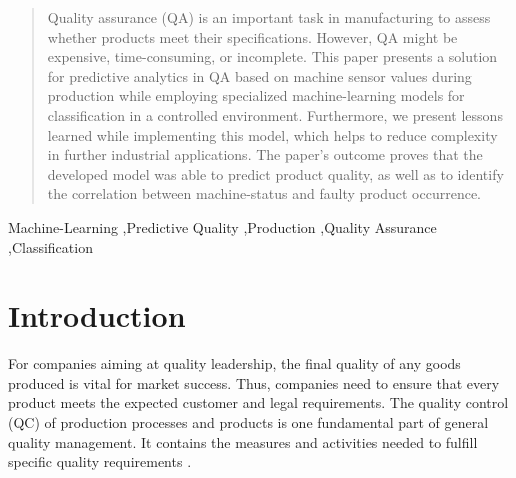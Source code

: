 \documentclass[5p,times,procedia]{elsarticle}
\begin{document}
\begin{frontmatter}
\begin{abstract}
Quality assurance (QA) is an important task in manufacturing to assess whether products 
meet their specifications. However, QA might be expensive, time-consuming, or incomplete.
This paper presents a solution for predictive analytics in QA based on machine sensor values during
production while employing specialized machine-learning models for classification in a controlled environment. 
Furthermore, we present lessons learned while implementing this model, which helps to reduce complexity in
further industrial applications. The paper’s outcome proves that the developed model was able to predict
product quality, as well as to identify the correlation between machine-status and faulty product occurrence.
\end{abstract}

\begin{keyword}
Machine-Learning \sep Predictive Quality \sep Production \sep Quality Assurance \sep Classification




\end{keyword}

\end{frontmatter}


\section{Introduction} %

For companies aiming at quality leadership, the final quality of any goods produced is vital for market success. Thus, companies need to ensure that every product meets the expected customer and legal requirements.
The quality control (QC) of production processes and products is one fundamental part of general quality management. It contains the measures and activities needed to fulfill specific quality requirements \cite{mitra2016fundamentals}.
\end{document}
